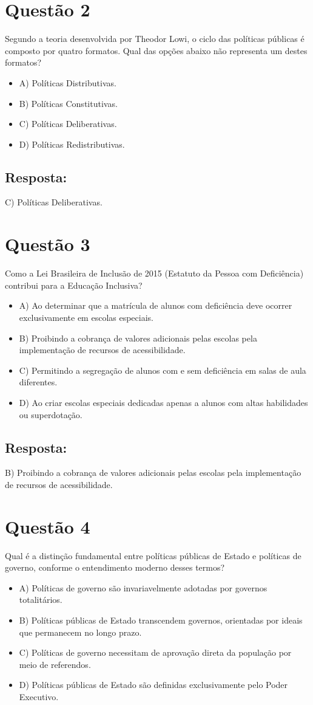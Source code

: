 \documentclass[
   article,       
   12pt,          
   oneside,       
   a4paper,       
   english,       
   brazil,        
   sumario=tradicional
   ]{abntex2}
\begin{document}
\section{Questão 2}
Segundo a teoria desenvolvida por Theodor Lowi, o ciclo das políticas públicas é composto por quatro formatos. Qual das opções abaixo não representa um destes formatos?
\begin{itemize}
    \item A) Políticas Distributivas.
    \item B) Políticas Constitutivas.
    \item C) Políticas Deliberativas.
    \item D) Políticas Redistributivas.
\end{itemize}
\subsection{Resposta:}
C) Políticas Deliberativas.

\section{Questão 3}
Como a Lei Brasileira de Inclusão de 2015 (Estatuto da Pessoa com Deficiência) contribui para a Educação Inclusiva?
\begin{itemize}
    \item A) Ao determinar que a matrícula de alunos com deficiência deve ocorrer exclusivamente em escolas especiais.
    \item B) Proibindo a cobrança de valores adicionais pelas escolas pela implementação de recursos de acessibilidade.
    \item C) Permitindo a segregação de alunos com e sem deficiência em salas de aula diferentes.
    \item D) Ao criar escolas especiais dedicadas apenas a alunos com altas habilidades ou superdotação.
\end{itemize}
\subsection{Resposta:}
B) Proibindo a cobrança de valores adicionais pelas escolas pela implementação de recursos de acessibilidade.

\section{Questão 4}
Qual é a distinção fundamental entre políticas públicas de Estado e políticas de governo, conforme o entendimento moderno desses termos?
\begin{itemize}
    \item A) Políticas de governo são invariavelmente adotadas por governos totalitários.
    \item B) Políticas públicas de Estado transcendem governos, orientadas por ideais que permanecem no longo prazo.
    \item C) Políticas de governo necessitam de aprovação direta da população por meio de referendos.
    \item D) Políticas públicas de Estado são definidas exclusivamente pelo Poder Executivo.
\end{itemize}
\end{document}
